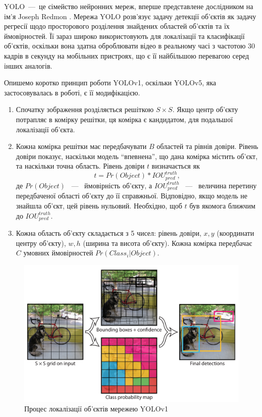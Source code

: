 YOLO~---~це сімейство нейронних мереж, вперше представлене дослідником на ім'я Joseph Redmon \cite{yolov1}.
Мережа YOLO розв'язує задачу детекції об'єктів як задачу регресії
щодо просторового розділення знайдених областей об'єктів та їх
ймовірностей. Її зараз широко використовують для локалізації та класифікації об'єктів,
оскільки вона здатна оброблювати відео в реальному часі з частотою 30 кадрів в секунду
на мобільних пристроях, що є її найбільшою перевагою серед інших аналогів.

Опишемо коротко принцип роботи YOLOv1, оскільки YOLOv5, яка застосовувалась
в роботі, є її модифікацією.
\begin{enumerate}
    \item Спочатку зображення розділяється решіткою $S \times S$.
          Якщо центр об'єкту потрапляє в комірку решітки, ця комірка
          є кандидатом, для подальшої локалізації об'єкта.
    \item Кожна комірка решітки має передбачувати $B$ областей та рівнів
          довіри. Рівень довіри показує, наскільки модель ``впевнена'',
          що дана комірка містить об'єкт, та наскільки точна область.
          Рівень довіри $t$ визначається  як
          \begin{equation*}
           t = Pr(Object)*{IOU}_{pred}^{truth}, 
          \end{equation*}
          де $Pr(Object)$ ~---~ ймовірність об'єкту, а ${IOU}_{pred}^{truth}$ ~---~ величина
          перетину передбаченої області об'єкту до її справжньої.
          Відповідно, якщо модель не знайшла об'єкт, цей рівень нульовий.
          Необхідно, щоб $t$ був якомога ближчим до ${IOU}_{pred}^{truth}$.
    \item Кожна область об'єкту складається з 5 чисел: рівень довіри,
      $x, y$ (координати центру об'єкту),  $w, h$ (ширина та висота об'єкту).
          Кожна комірка передбачає $C$ умовних ймовірностей $Pr(Class_i|Object)$.
\end{enumerate}

\begin{figure}[H]
    \includegraphics[width=0.5\linewidth]{images/cnn_yolo1}
    \centering
    \caption{Процес локалізації об'єктів мережею YOLOv1 \cite{yolov1}
    }
\end{figure}

